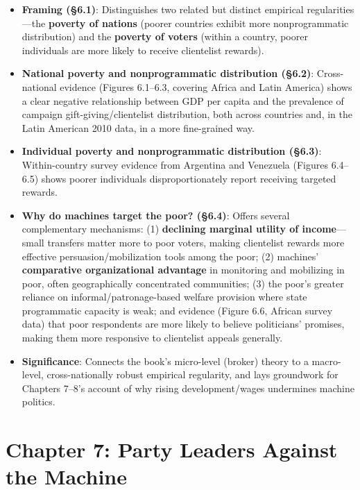 \documentclass[12pt]{article}
\begin{document}
\begin{itemize}[leftmargin=*, itemsep=4pt]
    \item \textbf{Framing (\S6.1)}: Distinguishes two related but distinct empirical regularities---the \textbf{poverty of nations} (poorer countries exhibit more nonprogrammatic distribution) and the \textbf{poverty of voters} (within a country, poorer individuals are more likely to receive clientelist rewards).
    \item \textbf{National poverty and nonprogrammatic distribution (\S6.2)}: Cross-national evidence (Figures 6.1--6.3, covering Africa and Latin America) shows a clear negative relationship between GDP per capita and the prevalence of campaign gift-giving/clientelist distribution, both across countries and, in the Latin American 2010 data, in a more fine-grained way.
    \item \textbf{Individual poverty and nonprogrammatic distribution (\S6.3)}: Within-country survey evidence from Argentina and Venezuela (Figures 6.4--6.5) shows poorer individuals disproportionately report receiving targeted rewards.
    \item \textbf{Why do machines target the poor? (\S6.4)}: Offers several complementary mechanisms: (1) \textbf{declining marginal utility of income}---small transfers matter more to poor voters, making clientelist rewards more effective persuasion/mobilization tools among the poor; (2) machines' \textbf{comparative organizational advantage} in monitoring and mobilizing in poor, often geographically concentrated communities; (3) the poor's greater reliance on informal/patronage-based welfare provision where state programmatic capacity is weak; and evidence (Figure 6.6, African survey data) that poor respondents are more likely to believe politicians' promises, making them more responsive to clientelist appeals generally.
    \item \textbf{Significance}: Connects the book's micro-level (broker) theory to a macro-level, cross-nationally robust empirical regularity, and lays groundwork for Chapters 7--8's account of why rising development/wages undermines machine politics.
\end{itemize}

\section{Chapter 7: Party Leaders Against the Machine}
\end{document}
